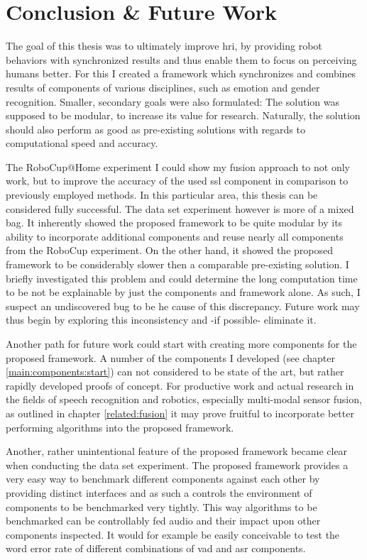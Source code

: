

\chapter{Conclusion \& Future Work}
\label{conclusion}

The goal of this thesis was to ultimately improve \gls{hri}, by providing robot behaviors with synchronized results and thus enable them to focus on perceiving humans better.
For this I created a framework which synchronizes and combines results of components of various disciplines, such as emotion and gender recognition.
Smaller, secondary goals were also formulated:
The solution was supposed to be modular, to increase its value for research.
Naturally, the solution should also perform as good as pre-existing solutions with regards to computational speed and accuracy.

The RoboCup@Home experiment I could show my fusion approach to not only work, but to improve the accuracy of the used \gls{ssl} component in comparison to previously employed methods.
In this particular area, this thesis can be considered fully successful.
The data set experiment however is more of a mixed bag.
It inherently showed the proposed framework to be quite modular by its ability to incorporate additional components and reuse nearly all components from the RoboCup experiment.
On the other hand, it showed the proposed framework to be considerably slower then a comparable pre-existing solution.
I briefly investigated this problem and could determine the long computation time to be not be explainable by just the components and framework alone.
As such, I suspect an undiscovered bug to be he cause of this discrepancy.
Future work may thus begin by exploring this inconsistency and -if possible- eliminate it.

Another path for future work could start with creating more components for the proposed framework.
A number of the components I developed (see chapter \ref{main:components:start}) can not considered to be state of the art, but rather rapidly developed proofs of concept.
For productive work and actual research in the fields of speech recognition and robotics, especially multi-modal sensor fusion, as outlined in chapter \ref{related:fusion} it may prove fruitful to incorporate better performing algorithms into the proposed framework.

Another, rather unintentional feature of the proposed framework became clear when conducting the data set experiment.
The proposed framework provides a very easy way to benchmark different components against each other by providing distinct interfaces and as such a controls the environment of components to be benchmarked very tightly.
This way algorithms to be benchmarked can be controllably fed audio and their impact upon other components inspected.
It would for example be easily conceivable to test the word error rate of different combinations of \gls{vad} and \gls{asr} components.


